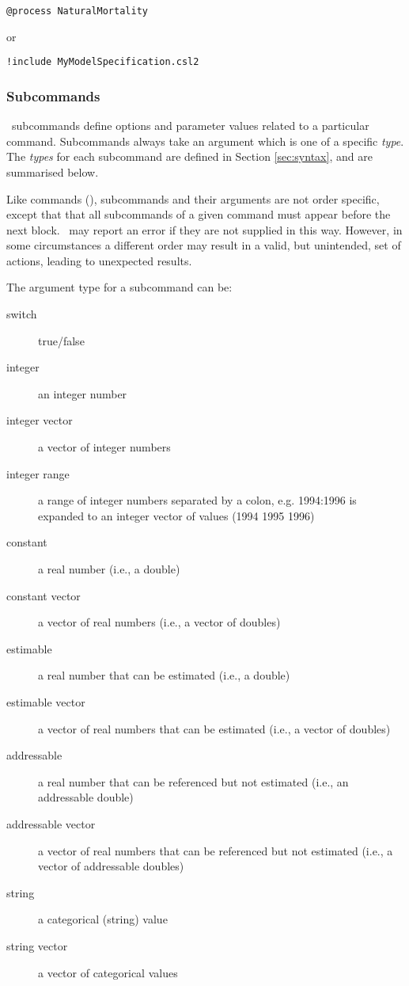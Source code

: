 {\small{\begin{verbatim}
@process NaturalMortality
\end{verbatim}}}
or
{\small{\begin{verbatim}
!include MyModelSpecification.csl2
\end{verbatim}}}

\subsubsection{Subcommands}

\CNAME\ subcommands define options and parameter values related to a particular command. Subcommands always take an argument which is one of a specific \emph{type}. The \emph{types} for each subcommand are defined in Section \ref{sec:syntax}, and are summarised below.

Like commands (), subcommands and their arguments are not order specific, except that that all subcommands of a given command must appear before the next  block. \CNAME\ may report an error if they are not supplied in this way. However, in some circumstances a different order may result in a valid, but unintended, set of actions, leading to unexpected results.

The argument type for a subcommand can be:

\begin{description}
    \item[switch] true/false
    \item[integer] an integer number
	\item[integer vector] a vector of integer numbers
	\item[integer range] a range of integer numbers separated by a colon, e.g. 1994:1996 is expanded to an integer vector of values (1994 1995 1996)
	\item[constant] a real number (i.e., a double)
	\item[constant vector] a vector of real numbers (i.e., a vector of doubles)
	\item[estimable] a real number that can be estimated (i.e., a double)
	\item[estimable vector] a vector of real numbers that can be estimated (i.e., a vector of doubles)
	\item[addressable] a real number that can be referenced but not estimated (i.e., an addressable double)
	\item[addressable vector] a vector of real numbers that can be referenced but not estimated (i.e., a vector of addressable doubles)
	\item[string] a categorical (string) value
	\item[string vector] a vector of categorical values
\end{description}

